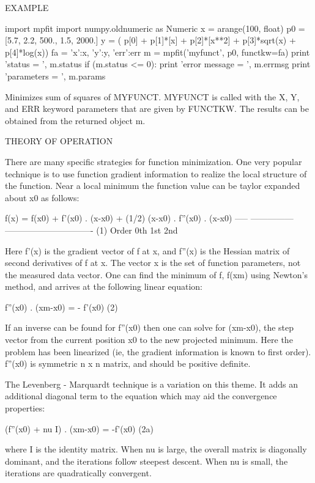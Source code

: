 \begin{DoxyVerb}
                       EXAMPLE

   import mpfit
   import numpy.oldnumeric as Numeric
   x = arange(100, float)
   p0 = [5.7, 2.2, 500., 1.5, 2000.]
   y = ( p[0] + p[1]*[x] + p[2]*[x**2] + p[3]*sqrt(x) +
         p[4]*log(x))
   fa = {'x':x, 'y':y, 'err':err}
   m = mpfit('myfunct', p0, functkw=fa)
   print 'status = ', m.status
   if (m.status <= 0): print 'error message = ', m.errmsg
   print 'parameters = ', m.params

   Minimizes sum of squares of MYFUNCT.  MYFUNCT is called with the X,
   Y, and ERR keyword parameters that are given by FUNCTKW.  The
   results can be obtained from the returned object m.


                THEORY OF OPERATION

   There are many specific strategies for function minimization.  One
   very popular technique is to use function gradient information to
   realize the local structure of the function.  Near a local minimum
   the function value can be taylor expanded about x0 as follows:

      f(x) = f(x0) + f'(x0) . (x-x0) + (1/2) (x-x0) . f''(x0) . (x-x0)
 -----   ---------------   -------------------------------  (1)
     Order  0th       1st                     2nd

   Here f'(x) is the gradient vector of f at x, and f''(x) is the
   Hessian matrix of second derivatives of f at x.  The vector x is
   the set of function parameters, not the measured data vector.  One
   can find the minimum of f, f(xm) using Newton's method, and
   arrives at the following linear equation:

      f''(x0) . (xm-x0) = - f'(x0)                          (2)

   If an inverse can be found for f''(x0) then one can solve for
   (xm-x0), the step vector from the current position x0 to the new
   projected minimum.  Here the problem has been linearized (ie, the
   gradient information is known to first order).  f''(x0) is
   symmetric n x n matrix, and should be positive definite.

   The Levenberg - Marquardt technique is a variation on this theme.
   It adds an additional diagonal term to the equation which may aid the
   convergence properties:

      (f''(x0) + nu I) . (xm-x0) = -f'(x0)                (2a)

   where I is the identity matrix.  When nu is large, the overall
   matrix is diagonally dominant, and the iterations follow steepest
   descent.  When nu is small, the iterations are quadratically
   convergent.


\end{DoxyVerb}
